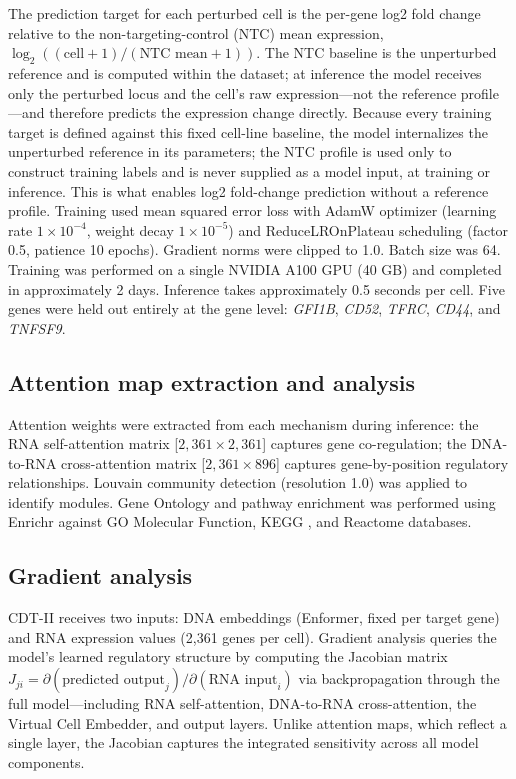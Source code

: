 \documentclass[12pt,a4paper]{article}
\begin{document}
The prediction target for each perturbed cell is the per-gene log2 fold change relative to the non-targeting-control (NTC) mean expression, $\log_2((\text{cell}+1)/(\text{NTC mean}+1))$. The NTC baseline is the unperturbed reference and is computed within the dataset; at inference the model receives only the perturbed locus and the cell's raw expression---not the reference profile---and therefore predicts the expression change directly. Because every training target is defined against this fixed cell-line baseline, the model internalizes the unperturbed reference in its parameters; the NTC profile is used only to construct training labels and is never supplied as a model input, at training or inference. This is what enables log2 fold-change prediction without a reference profile. Training used mean squared error loss with AdamW \citep{loshchilov2019} optimizer (learning rate $1 \times 10^{-4}$, weight decay $1 \times 10^{-5}$) and ReduceLROnPlateau scheduling (factor 0.5, patience 10 epochs). Gradient norms were clipped to 1.0. Batch size was 64. Training was performed on a single NVIDIA A100 GPU (40 GB) and completed in approximately 2 days. Inference takes approximately 0.5 seconds per cell. Five genes were held out entirely at the gene level: \textit{GFI1B}, \textit{CD52}, \textit{TFRC}, \textit{CD44}, and \textit{TNFSF9}.

\subsection{Attention map extraction and analysis}\label{subsec:attention}

Attention weights were extracted from each mechanism during inference: the RNA self-attention matrix [$2{,}361 \times 2{,}361$] captures gene co-regulation; the DNA-to-RNA cross-attention matrix [$2{,}361 \times 896$] captures gene-by-position regulatory relationships. Louvain community detection \citep{blondel2008} (resolution 1.0) was applied to identify modules. Gene Ontology \citep{ashburner2000} and pathway enrichment was performed using Enrichr \citep{kuleshov2016} against GO Molecular Function, KEGG \citep{kanehisa2000}, and Reactome \citep{jassal2020} databases.

\subsection{Gradient analysis}

CDT-II receives two inputs: DNA embeddings (Enformer, fixed per target gene) and RNA expression values (2,361 genes per cell). Gradient analysis queries the model's learned regulatory structure by computing the Jacobian matrix $J_{ji} = \partial(\text{predicted output}_j)/\partial(\text{RNA input}_i)$ via backpropagation through the full model---including RNA self-attention, DNA-to-RNA cross-attention, the Virtual Cell Embedder, and output layers. Unlike attention maps, which reflect a single layer, the Jacobian captures the integrated sensitivity across all model components.
\end{document}
